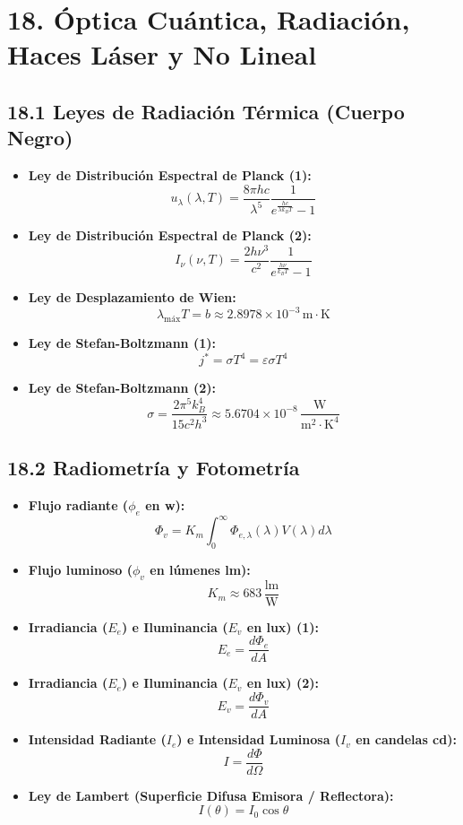 \documentclass[11pt,a4paper]{article}
\begin{document}
\section*{18. Óptica Cuántica, Radiación, Haces Láser y No Lineal}

\subsection*{18.1 Leyes de Radiación Térmica (Cuerpo Negro)}

\begin{itemize}
  \item \textbf{Ley de Distribución Espectral de Planck (1):}
  \[
    u_\lambda(\lambda, T) = \frac{8\pi h c}{\lambda^5} \frac{1}{e^{\frac{h c}{\lambda k_B T}} - 1}
  \]
  \item \textbf{Ley de Distribución Espectral de Planck (2):}
  \[
    I_\nu(\nu, T) = \frac{2h\nu^3}{c^2}\frac{1}{e^{\frac{h\nu}{k_B T}} - 1}
  \]
  \item \textbf{Ley de Desplazamiento de Wien:}
  \[
    \lambda_{\mathrm{máx}} T = b \approx 2.8978 \times 10^{-3} \, \mathrm{m}\cdot\mathrm{K}
  \]
  \item \textbf{Ley de Stefan-Boltzmann (1):}
  \[
    j^* = \sigma T^4 = \varepsilon \sigma T^4
  \]
  \item \textbf{Ley de Stefan-Boltzmann (2):}
  \[
    \sigma = \frac{2\pi^5 k_B^4}{15 c^2 h^3} \approx 5.6704 \times 10^{-8} \, \frac{\mathrm{W}}{\mathrm{m}^2\cdot\mathrm{K}^4}
  \]
\end{itemize}

\subsection*{18.2 Radiometría y Fotometría}

\begin{itemize}
  \item \textbf{Flujo radiante ($\phi_e$ en w):}
  \[
    \Phi_v = K_m \int_0^\infty \Phi_{e,\lambda}(\lambda) V(\lambda) d\lambda
  \]
  \item \textbf{Flujo luminoso ($\phi_v$ en lúmenes lm):}
  \[
    K_m \approx 683 \, \frac{\mathrm{lm}}{\mathrm{W}}
  \]
  \item \textbf{Irradiancia ($E_e$) e Iluminancia ($E_v$ en lux) (1):}
  \[
    E_e = \frac{d\Phi_e}{dA}
  \]
  \item \textbf{Irradiancia ($E_e$) e Iluminancia ($E_v$ en lux) (2):}
  \[
    E_v = \frac{d\Phi_v}{dA}
  \]
  \item \textbf{Intensidad Radiante ($I_e$) e Intensidad Luminosa ($I_v$ en candelas cd):}
  \[
    I = \frac{d\Phi}{d\Omega}
  \]
  \item \textbf{Ley de Lambert (Superficie Difusa Emisora / Reflectora):}
  \[
    I(\theta) = I_0 \cos\theta
  \]
\end{itemize}
\end{document}
